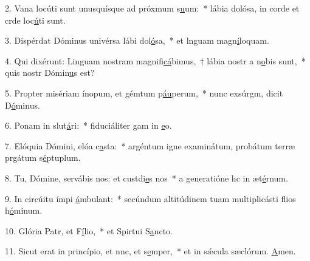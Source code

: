 2. Vana locúti sunt unusquísque ad próxmum s\uline{u}um:~* lábia dolósa, in corde et crde loc\uline{ú}ti sunt.\par 
3. Dispérdat Dóminus univérsa lábi dol\uline{ó}sa,~* et lnguam magn\uline{í}loquam.\par 
4. Qui dixérunt: Linguam nostram magnifi\uline{cá}bimus,~† lábia nostr a n\uline{o}bis sunt,~* quis nostr Dómin\uline{u}s est?\par 
5. Propter misériam ínopum, et gémtum p\uline{áu}perum,~* nunc exsúrgm, dicit D\uline{ó}minus.\par 
6. Ponam in slut\uline{á}ri:~* fiduciáliter gam in \uline{e}o.\par 
7. Elóquia Dómini, elóa c\uline{a}sta:~* argéntum igne examinátum, probátum terræ prgátum s\uline{é}ptuplum.\par 
8. Tu, Dómine, servábis nos: et custdi\uline{e}s nos~* a generatióne hc in æt\uline{é}rnum.\par 
9. In circúitu ímpi \uline{á}mbulant:~* secúndum altitúdinem tuam multiplicásti flios h\uline{ó}minum.\par 
10. Glória Patr, et F\uline{í}lio,~* et Spirtui S\uline{a}ncto.\par 
11. Sicut erat in princípio, et nnc, et s\uline{e}mper,~* et in sǽcula sæclórum. \uline{A}men.\par 
